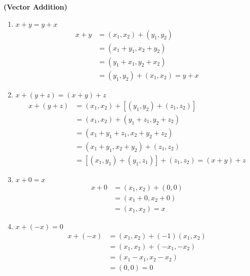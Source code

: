 \documentclass[12pt]{article}
\begin{document}
\textbf{(Vector Addition)}
\begin{enumerate}
    \item $x + y = y + x$
        \begin{align*}
            x + y &= (x_1,x_2) + (y_1,y_2) \\
            &= (x_1+y_1,x_2+y_2) \\
            &= (y_1+x_1,y_2+x_2) \\
            &= (y_1,y_2) + (x_1,x_2) = y + x
        \end{align*}
    \item $x + (y + z) = (x + y) + z$ 
        \begin{align*}
            x + (y + z) &= (x_1,x_2) + [(y_1,y_2) + (z_1,z_2)] \\
            &= (x_1,x_2) + (y_1+z_1, y_2+z_2) \\
            &= (x_1+y_1+z_1, x_2+y_2+z_2) \\
            &= (x_1+y_1,x_2+y_2) + (z_1,z_2) \\
            &= [(x_1,y_1) + (y_1,z_1)] + (z_1,z_2) = (x + y) + z
        \end{align*}
        \item $x + 0 = x$
            \begin{align*}
                x + 0 &= (x_1,x_2) + (0,0) \\
                &= (x_1+0,x_2+0) \\
                &= (x_1,x_2) = x
            \end{align*}
        \item $x + (-x) = 0$
            \begin{align*}
                x + (-x) &= (x_1,x_2) + (-1)(x_1,x_2) \\
                &= (x_1,x_2) + (-x_1,-x_2) \\
                &= (x_1-x_1,x_2-x_2) \\
                &= (0,0) = 0
            \end{align*}
\end{enumerate}
\end{document}
